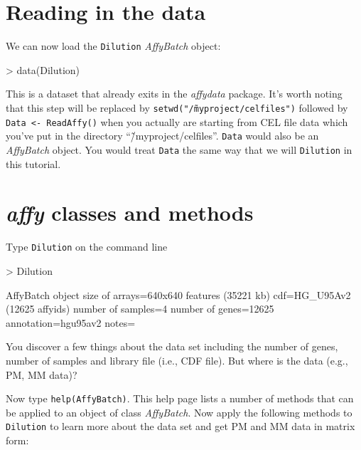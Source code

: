 \documentclass[12pt]{article}
\newcommand{\code}[1]{{\texttt{#1}}}
\begin{document}
\section{Reading in the data}

We can now load the \code{Dilution} {\it AffyBatch} object:

\begin{Schunk}
\begin{Sinput}
> data(Dilution)
\end{Sinput}
\end{Schunk}

This is a dataset that already exits in the {\it affydata} package.  It's worth noting that this step will be replaced by
\code{setwd("\~/myproject/celfiles")} followed by \code{Data <- ReadAffy()} when you actually are starting from CEL file data which you've put in the directory ``\~/myproject/celfiles''.  \code{Data} would also be an {\it AffyBatch} object.  You would treat \code{Data} the same way that we will \code{Dilution} in this tutorial.   

\section{{\it affy} classes and methods}

Type \code{Dilution} on the command line

\begin{Schunk}
\begin{Sinput}
> Dilution
\end{Sinput}
\begin{Soutput}
AffyBatch object
size of arrays=640x640 features (35221 kb)
cdf=HG_U95Av2 (12625 affyids)
number of samples=4
number of genes=12625
annotation=hgu95av2
notes=
\end{Soutput}
\end{Schunk}

You discover a few things about the data set including the number of genes, number of samples and library file (i.e., CDF file).  But where is the data (e.g., PM, MM data)?

Now type \code{help(AffyBatch)}.  This help page lists a number of methods that can be applied to an object of class {\it AffyBatch}.  Now apply the following methods to \code{Dilution} to learn more about the data set and get PM and MM data in matrix form:
\end{document}

